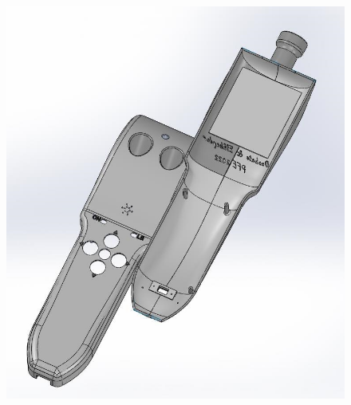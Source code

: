 \FloatBarrier

\begin{figure}[!htbp]
    \centering
    \includegraphics[width=\linewidth]{assets/conception1/img349.jpg}
\end{figure}

\FloatBarrier

